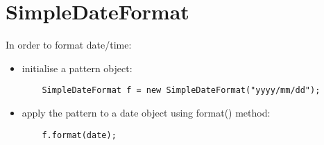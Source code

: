\documentclass{report}
\begin{document}

\section{SimpleDateFormat}
In order to format date/time:
\begin{itemize}
	\item initialise a pattern object:
	\begin{verbatim}
	SimpleDateFormat f = new SimpleDateFormat("yyyy/mm/dd");
	\end{verbatim}
	\item apply the pattern to a date object using format() method:
	\begin{verbatim}
	f.format(date);
	\end{verbatim}
\end{itemize}
\end{document}
